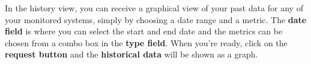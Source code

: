\documentclass{l3proj}
\begin{document}
\begin{appendices}
In the history view, you can receive a graphical view of your past data for any of your monitored systems, simply by choosing a date range and a metric. The \textbf{date field} is where you can select the start and end date and the metrics can be chosen from a combo box in the \textbf{type field}. When you're ready, click on the \textbf{request button} and the \textbf{historical data} will be shown as a graph. 



\end{appendices}



\end{document}
